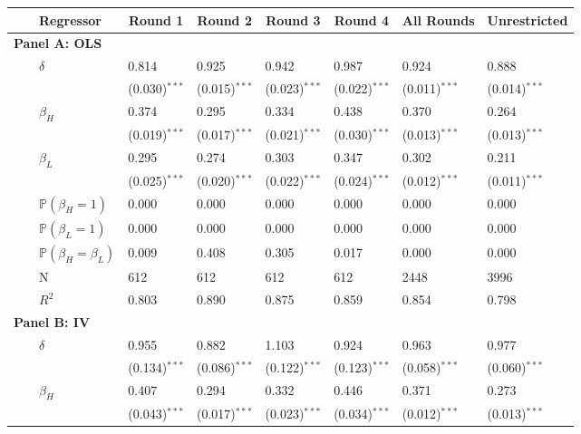 %
\begin{tabular*}{\textwidth}{@{\extracolsep{\fill}}llllllll}\hline\hline
\multicolumn{1}{l}{}&\multicolumn{1}{l}{Regressor}&\multicolumn{1}{c}{Round 1}&\multicolumn{1}{c}{Round 2}&\multicolumn{1}{c}{Round 3}&\multicolumn{1}{c}{Round 4}&\multicolumn{1}{c}{All Rounds}&\multicolumn{1}{c}{Unrestricted}\tabularnewline
\hline
\multicolumn{8}{l}{{\bfseries Panel A: OLS}}\tabularnewline
~~&$\delta$&0.814&0.925&0.942&0.987&0.924&0.888\tabularnewline
~~&&{\scriptsize (0.030)$^{***}$}&{\scriptsize (0.015)$^{***}$}&{\scriptsize (0.023)$^{***}$}&{\scriptsize (0.022)$^{***}$}&{\scriptsize (0.011)$^{***}$}&{\scriptsize (0.014)$^{***}$}\tabularnewline
~~&$\beta_H$&0.374&0.295&0.334&0.438&0.370&0.264\tabularnewline
~~&&{\scriptsize (0.019)$^{***}$}&{\scriptsize (0.017)$^{***}$}&{\scriptsize (0.021)$^{***}$}&{\scriptsize (0.030)$^{***}$}&{\scriptsize (0.013)$^{***}$}&{\scriptsize (0.013)$^{***}$}\tabularnewline
~~&$\beta_L$&0.295&0.274&0.303&0.347&0.302&0.211\tabularnewline
~~&&{\scriptsize (0.025)$^{***}$}&{\scriptsize (0.020)$^{***}$}&{\scriptsize (0.022)$^{***}$}&{\scriptsize (0.024)$^{***}$}&{\scriptsize (0.012)$^{***}$}&{\scriptsize (0.011)$^{***}$}\tabularnewline
~~&$\mathbb{P}(\beta_H = 1)$&0.000&0.000&0.000&0.000&0.000&0.000\tabularnewline
~~&$\mathbb{P}(\beta_L = 1)$&0.000&0.000&0.000&0.000&0.000&0.000\tabularnewline
~~&$\mathbb{P}(\beta_H = \beta_L)$&0.009&0.408&0.305&0.017&0.000&0.000\tabularnewline
~~&N&612&612&612&612&2448&3996\tabularnewline
~~&$R^2$&0.803&0.890&0.875&0.859&0.854&0.798\tabularnewline
\hline
\multicolumn{8}{l}{{\bfseries Panel B: IV}}\tabularnewline
~~&$\delta$&0.955&0.882&1.103&0.924&0.963&0.977\tabularnewline
~~&&{\scriptsize (0.134)$^{***}$}&{\scriptsize (0.086)$^{***}$}&{\scriptsize (0.122)$^{***}$}&{\scriptsize (0.123)$^{***}$}&{\scriptsize (0.058)$^{***}$}&{\scriptsize (0.060)$^{***}$}\tabularnewline
~~&$\beta_H$&0.407&0.294&0.332&0.446&0.371&0.273\tabularnewline
~~&&{\scriptsize (0.043)$^{***}$}&{\scriptsize (0.017)$^{***}$}&{\scriptsize (0.023)$^{***}$}&{\scriptsize (0.034)$^{***}$}&{\scriptsize (0.012)$^{***}$}&{\scriptsize (0.013)$^{***}$}\tabularnewline

\end{tabular*}
